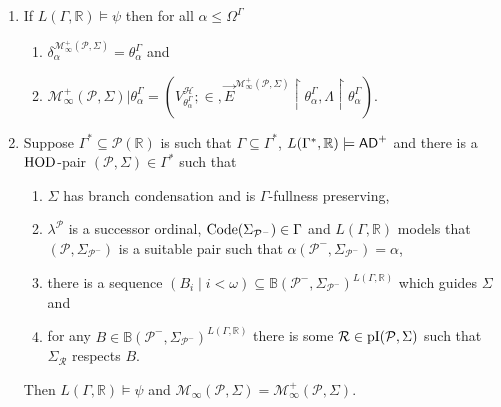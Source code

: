 \documentclass[../../main]{subfiles}
\begin{document}
{\begin{enumerate}
  \item If $L(\Gamma, \mathbb{R}) \models \psi$  then for all $\alpha \le \Omega^{\Gamma}$
    \begin{enumerate}
    \item $\delta_{\alpha}^{\mathcal{M}^{+}_{\infty}(\mathcal{P}, \Sigma)}
      = \theta^{\Gamma}_{\alpha}$ and
    \item
      $\mathcal{M}^{+}_{\infty}(\mathcal{P}, \Sigma) |
      \theta^{\Gamma}_{\alpha} =
      (V^{\mathcal{H}}_{\theta^{\Gamma}_{\alpha}};\in,
      \vec{E}^{\mathcal{M}^{+}_{\infty}(\mathcal{P}, \Sigma)}
      \restriction \theta^{\Gamma}_{\alpha}, \Lambda \restriction
      \theta^{\Gamma}_{\alpha})$.
    \end{enumerate}
  \item Suppose $\Gamma^{*} \subseteq \mathcal{P}(\mathbb{R})$ is such
    that $\Gamma \subseteq \Gamma^{*}$,
    $L(\Gamma^{*}, \mathbb{R}) \models \textsf{AD}^{+}$ and there is a
    $\operatorname{HOD}$-pair $(\mathcal{P}, \Sigma) \in \Gamma^{*}$ such that
    \begin{enumerate}
    \item $\Sigma$ has branch condensation and is $\Gamma$-fullness preserving,
    \item $\lambda^{\mathcal{P}}$ is a successor ordinal,
      $\operatorname{Code}(\Sigma_{\mathcal{P}^{-}}) \in \Gamma$ and
      $L(\Gamma, \mathbb{R})$ models that $(\mathcal{P}, \Sigma_{\mathcal{P}^{-}})$ is a suitable pair such that
      $\alpha(\mathcal{P}^{-}, \Sigma_{\mathcal{P}^{-}}) = \alpha$, 
    \item there is a sequence
      $(B_{i} \mid i < \omega) \subseteq \mathbb{B}(\mathcal{P}^{-},
      \Sigma_{\mathcal{P}^{-}})^{L(\Gamma, \mathbb{R})}$ which guides
      $\Sigma$ and 
    \item for any
      $B \in \mathbb{B}(\mathcal{P}^{-},
      \Sigma_{\mathcal{P}^{-}})^{L(\Gamma, \mathbb{R})}$ there is some
      $\mathcal{R} \in \operatorname{pI}(\mathcal{P}, \Sigma)$ such that
      $\Sigma_{\mathcal{R}}$ respects $B$. 
    \end{enumerate}
    Then $L(\Gamma, \mathbb{R}) \models \psi$ and
    $\mathcal{M}_{\infty}(\mathcal{P}, \Sigma) =
    \mathcal{M}^{+}_{\infty}(\mathcal{P}, \Sigma)$.
  \end{enumerate}
}

\end{document}
